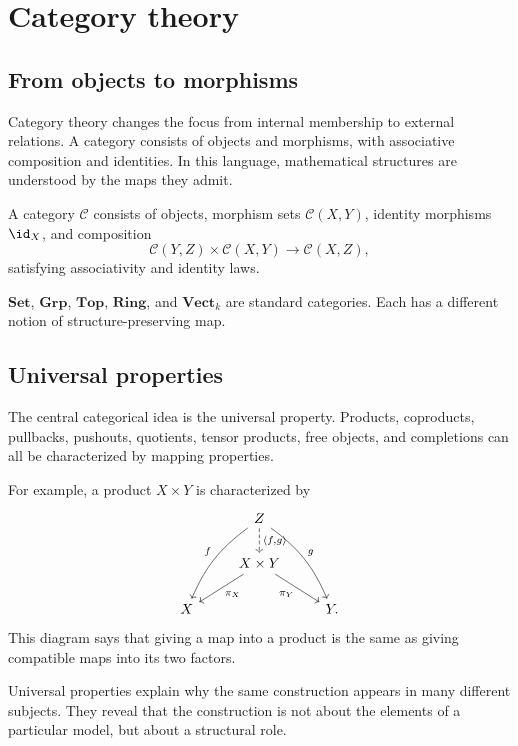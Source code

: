 \section{Category theory}

\subsection{From objects to morphisms}

Category theory changes the focus from internal membership to external relations.  A category consists of objects and morphisms, with associative composition and identities.  In this language, mathematical structures are understood by the maps they admit.

\begin{definition}
A category \(\mathcal C\) consists of objects, morphism sets \(\mathcal C(X,Y)\), identity morphisms \(\id_X\), and composition
\[
  \mathcal C(Y,Z)\times \mathcal C(X,Y)\to \mathcal C(X,Z),
\]
satisfying associativity and identity laws.
\end{definition}

\begin{example}
\(\mathbf{Set}\), \(\mathbf{Grp}\), \(\mathbf{Top}\), \(\mathbf{Ring}\), and \(\mathbf{Vect}_k\) are standard categories.  Each has a different notion of structure-preserving map.
\end{example}

\subsection{Universal properties}

The central categorical idea is the universal property.  Products, coproducts, pullbacks, pushouts, quotients, tensor products, free objects, and completions can all be characterized by mapping properties.

For example, a product \(X\times Y\) is characterized by
\[
\begin{tikzcd}
& Z \arrow[ddl,bend right=15,swap,"f"] \arrow[ddr,bend left=15,"g"] \arrow[d,dashed,"{\langle f,g\rangle}"] & \\
& X\times Y \arrow[dl,"\pi_X"] \arrow[dr,swap,"\pi_Y"] & \\
X && Y.
\end{tikzcd}
\]
This diagram says that giving a map into a product is the same as giving compatible maps into its two factors.

\begin{remark}
Universal properties explain why the same construction appears in many different subjects.  They reveal that the construction is not about the elements of a particular model, but about a structural role.
\end{remark}

